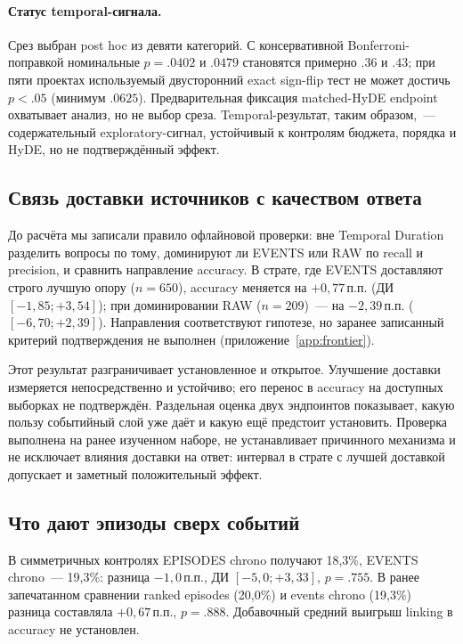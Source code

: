 \documentclass[11pt,a4paper]{article}
\newcommand{\raw}{RAW}
\newcommand{\events}{EVENTS}
\newcommand{\episodes}{EPISODES}
\newcommand{\pp}{\,\text{п.п.}}
\begin{document}
\paragraph{Статус temporal-сигнала.}
Срез выбран post hoc из девяти категорий. С консервативной Bonferroni-поправкой
номинальные $p=.0402$ и $.0479$ становятся примерно $.36$ и $.43$; при пяти
проектах используемый двусторонний exact sign-flip тест не может достичь
$p<.05$ (минимум $.0625$). Предварительная фиксация matched-HyDE endpoint
охватывает анализ, но не выбор среза. Temporal-результат, таким образом,~---
содержательный exploratory-сигнал, устойчивый к контролям бюджета, порядка и
HyDE, но не подтверждённый эффект.

\subsection{Связь доставки источников с качеством ответа}
\label{sec:frontier}

До расчёта мы записали правило офлайновой проверки: вне Temporal Duration
разделить вопросы по тому, доминируют ли \events{} или \raw{} по recall и precision,
и сравнить направление accuracy. В страте, где \events{} доставляют строго лучшую
опору ($n=650$), accuracy меняется на $+0{,}77\pp$ (ДИ $[-1{,}85;+3{,}54]$); при
доминировании \raw{} ($n=209$)~--- на $-2{,}39\pp$ ($[-6{,}70;+2{,}39]$). Направления
соответствуют гипотезе, но заранее записанный критерий подтверждения не выполнен
(приложение~\ref{app:frontier}).

Этот результат разграничивает установленное и открытое. Улучшение доставки
измеряется непосредственно и устойчиво; его перенос в accuracy на доступных
выборках не подтверждён. Раздельная оценка двух эндпоинтов показывает, какую
пользу событийный слой уже даёт и какую ещё предстоит установить. Проверка
выполнена на ранее изученном наборе, не устанавливает причинного механизма и не
исключает влияния доставки на ответ: интервал в страте с лучшей доставкой
допускает и заметный положительный эффект.

\subsection{Что дают эпизоды сверх событий}
\label{sec:episodes}

В симметричных контролях \episodes{} chrono получают 18,3\%, \events{} chrono~---
19,3\%: разница $-1{,}0\pp$, ДИ $[-5{,}0;+3{,}33]$, $p=.755$. В ранее запечатанном
сравнении ranked episodes (20,0\%) и events chrono (19,3\%) разница составляла
$+0{,}67\pp$, $p=.888$. Добавочный средний выигрыш linking в accuracy не установлен.
\end{document}
